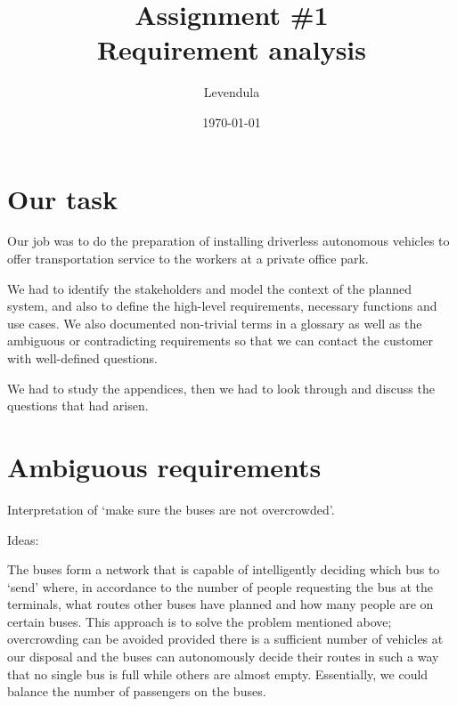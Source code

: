 \documentclass[a4paper]{article}
\title{Assignment \#1 \\ Requirement analysis}
\author{Levendula}
\date{\today}
\begin{document}


\tableofcontents
\clearpage

\section{Our task}



Our job was to do the preparation of installing driverless autonomous vehicles
to offer transportation service to the workers at a private office park.

We had to identify the stakeholders and model the context of the planned system,
and also to define the high-level requirements, necessary functions and use
cases. We also documented non-trivial terms in a glossary as well as the
ambiguous or contradicting requirements so that we can contact the customer with
well-defined questions.

We had to study the appendices, then we had to look through and discuss the
questions that had arisen.


\section{Ambiguous requirements}


Interpretation of ‘make sure the buses are not overcrowded’.

Ideas:

The buses form a network that is capable of intelligently deciding which bus to ‘send’ where, in accordance to the number of people requesting the bus at the terminals, what routes other buses have planned and how many people are on certain buses. This approach is to solve the problem mentioned above; overcrowding can be avoided provided there is a sufficient number of vehicles at our disposal and the buses can autonomously decide their routes in such a way that no single bus is full while others are almost empty. Essentially, we could balance the number of passengers on the buses.
\end{document}
